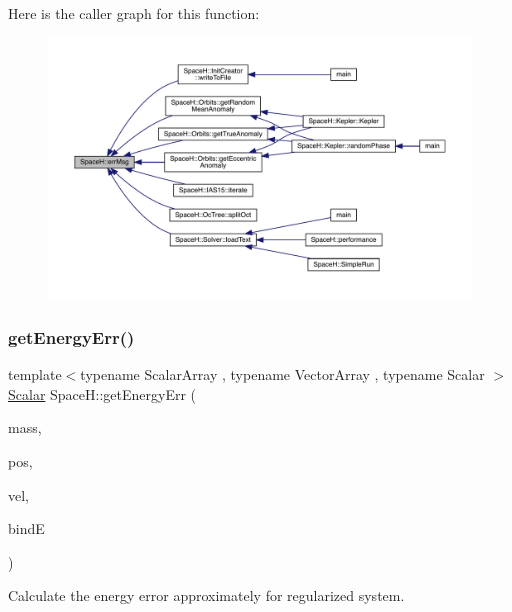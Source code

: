 Here is the caller graph for this function\+:
\nopagebreak
\begin{figure}[H]
\begin{center}
\leavevmode
\includegraphics[width=350pt]{namespace_space_h_af7bd0f1f17522b3122fa19f037a12ccc_icgraph}
\end{center}
\end{figure}
\mbox{\label{namespace_space_h_af674a32e51a168974fbb76585ba803d9}} 
\subsubsection{\texorpdfstring{get\+Energy\+Err()}{getEnergyErr()}}
{\footnotesize\ttfamily template$<$typename Scalar\+Array , typename Vector\+Array , typename Scalar $>$ \\
\mbox{\hyperlink{create_kepler_8cpp_a8c2981f3f834be9448a6ab06c28748eb}{Scalar}} Space\+H\+::get\+Energy\+Err (\begin{DoxyParamCaption}\item[{const Scalar\+Array \&}]{mass,  }\item[{const Vector\+Array \&}]{pos,  }\item[{const Vector\+Array \&}]{vel,  }\item[{const \mbox{\hyperlink{create_kepler_8cpp_a8c2981f3f834be9448a6ab06c28748eb}{Scalar}}}]{bindE }\end{DoxyParamCaption})\hspace{0.3cm}{\ttfamily [inline]}}



Calculate the energy error approximately for regularized system. 


